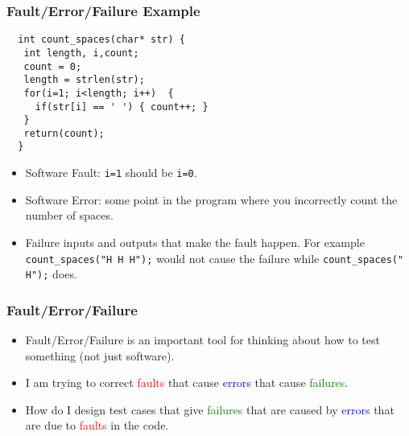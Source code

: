 \documentclass{beamer}
\begin{document}
\begin{frame}[fragile]
  \frametitle{Fault/Error/Failure Example}
\begin{lstlisting}
  int count_spaces(char* str) {
   int length, i,count;
   count = 0;
   length = strlen(str);
   for(i=1; i<length; i++)  { 
     if(str[i] == ' ') { count++; }
   }
   return(count);
  }
\end{lstlisting}
  \begin{itemize}
  \item Software Fault: {\tt i=1} should be {\tt i=0}.
  \item Software Error: some point in the program where you
    incorrectly count the number of spaces.
  \item Failure  inputs and outputs that make the fault happen. For
    example {\tt count\_spaces("H H H");} would not cause the failure
    while {\tt count\_spaces(" H");} does.
  \end{itemize}
\end{frame}
\begin{frame}
  \frametitle{Fault/Error/Failure}
  \begin{itemize}
  \item Fault/Error/Failure is an important tool for thinking about how to
    test something (not just software).
  \item I am trying to correct \textcolor{red}{faults} that cause
    \textcolor{blue}{errors} that cause \textcolor{green}{failures}.
  \item How do I design test cases that give  \textcolor{green}{failures} that
    are caused by  \textcolor{blue}{errors} that are due to
    \textcolor{red}{faults} in the code.
  \end{itemize}
\end{frame}
\end{document}
